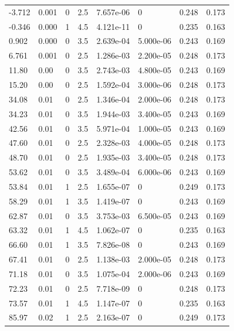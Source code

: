 \documentclass[preview]{standalone}
\begin{document}
{{\begin{tabular}{L{1.2cm}C{1.2cm} C{0.3cm}C{0.5cm} C{1.4cm}C{1.4cm} C{1.4cm}C{1.4cm}}
  -3.712  &  0.001  & 0     & 2.5 &  7.657e-06  & 0  & 0.248 &  0.173   \\ 
  -0.346  &  0.000  & 1     & 4.5 &  4.121e-11  & 0  & 0.235 &  0.163   \\ 
  0.902  &  0.000  & 0     & 3.5 &  2.639e-04  & 5.000e-06  & 0.243 &  0.169   \\ 
  6.761  &  0.001  & 0     & 2.5 &  1.286e-03  & 2.200e-05  & 0.248 &  0.173   \\ 
  11.80  &  0.00  & 0     & 3.5 &  2.743e-03  & 4.800e-05  & 0.243 &  0.169   \\ 
  15.20  &  0.00  & 0     & 2.5 &  1.592e-04  & 3.000e-06  & 0.248 &  0.173   \\ 
  34.08  &  0.01  & 0     & 2.5 &  1.346e-04  & 2.000e-06  & 0.248 &  0.173   \\ 
  34.23  &  0.01  & 0     & 3.5 &  1.944e-03  & 3.400e-05  & 0.243 &  0.169   \\ 
  42.56  &  0.01  & 0     & 3.5 &  5.971e-04  & 1.000e-05  & 0.243 &  0.169   \\ 
  47.60  &  0.01  & 0     & 2.5 &  2.328e-03  & 4.000e-05  & 0.248 &  0.173   \\ 
  48.70  &  0.01  & 0     & 2.5 &  1.935e-03  & 3.400e-05  & 0.248 &  0.173   \\ 
  53.62  &  0.01  & 0     & 3.5 &  3.489e-04  & 6.000e-06  & 0.243 &  0.169   \\ 
  53.84  &  0.01  & 1     & 2.5 &  1.655e-07  & 0  & 0.249 &  0.173   \\ 
  58.29  &  0.01  & 1     & 3.5 &  1.419e-07  & 0  & 0.243 &  0.169   \\ 
  62.87  &  0.01  & 0     & 3.5 &  3.753e-03  & 6.500e-05  & 0.243 &  0.169   \\ 
  63.32  &  0.01  & 1     & 4.5 &  1.062e-07  & 0  & 0.235 &  0.163   \\ 
  66.60  &  0.01  & 1     & 3.5 &  7.826e-08  & 0  & 0.243 &  0.169   \\ 
  67.41  &  0.01  & 0     & 2.5 &  1.138e-03  & 2.000e-05  & 0.248 &  0.173   \\ 
  71.18  &  0.01  & 0     & 3.5 &  1.075e-04  & 2.000e-06  & 0.243 &  0.169   \\ 
  72.23  &  0.01  & 0     & 2.5 &  7.718e-09  & 0  & 0.248 &  0.173   \\ 
  73.57  &  0.01  & 1     & 4.5 &  1.147e-07  & 0  & 0.235 &  0.163   \\ 
  85.97  &  0.02  & 1     & 2.5 &  2.163e-07  & 0  & 0.249 &  0.173   \\ 

\end{tabular}}}
\end{document}
